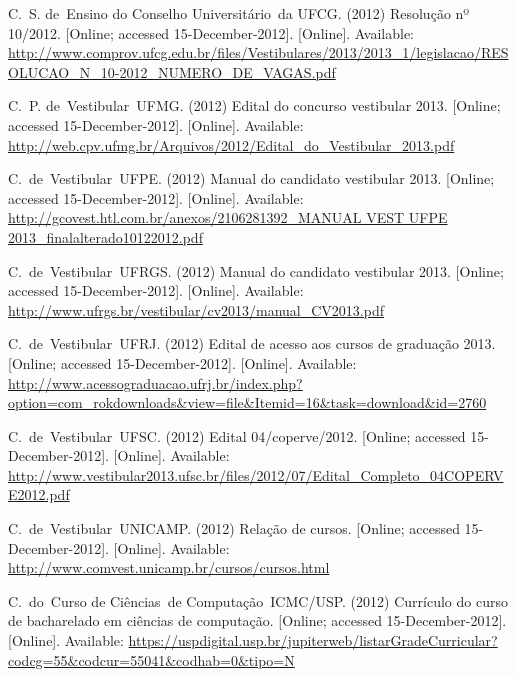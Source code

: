 \documentclass[conference]{IEEEtran}
\begin{document}
\begin{thebibliography}{10}
\BIBentryALTinterwordspacing
C.~S. de~Ensino do Conselho Universit\'ario~da UFCG. (2012) Resolu{\c c}{\~a}o
  nº 10/2012. [Online; accessed 15-December-2012]. [Online]. Available:
  \url{http://www.comprov.ufcg.edu.br/files/Vestibulares/2013/2013_1/legislacao/RESOLUCAO_N_10-2012_NUMERO_DE_VAGAS.pdf}
\BIBentrySTDinterwordspacing

\BIBentryALTinterwordspacing
C.~P. de~Vestibular~UFMG. (2012) Edital do concurso vestibular 2013. [Online;
  accessed 15-December-2012]. [Online]. Available:
  \url{http://web.cpv.ufmg.br/Arquivos/2012/Edital_do_Vestibular_2013.pdf}
\BIBentrySTDinterwordspacing

\BIBentryALTinterwordspacing
C.~de~Vestibular~UFPE. (2012) Manual do candidato vestibular 2013. [Online;
  accessed 15-December-2012]. [Online]. Available:
  \url{http://gcovest.htl.com.br/anexos/2106281392_MANUAL VEST UFPE
  2013_finalalterado10122012.pdf}
\BIBentrySTDinterwordspacing

\BIBentryALTinterwordspacing
C.~de~Vestibular~UFRGS. (2012) Manual do candidato vestibular 2013. [Online;
  accessed 15-December-2012]. [Online]. Available:
  \url{http://www.ufrgs.br/vestibular/cv2013/manual_CV2013.pdf}
\BIBentrySTDinterwordspacing

\BIBentryALTinterwordspacing
C.~de~Vestibular~UFRJ. (2012) Edital de acesso aos cursos de gradua{\c c}{\~a}o
  2013. [Online; accessed 15-December-2012]. [Online]. Available:
  \url{http://www.acessograduacao.ufrj.br/index.php?option=com_rokdownloads&view=file&Itemid=16&task=download&id=2760}
\BIBentrySTDinterwordspacing

\BIBentryALTinterwordspacing
C.~de~Vestibular~UFSC. (2012) Edital 04/coperve/2012. [Online; accessed
  15-December-2012]. [Online]. Available:
  \url{http://www.vestibular2013.ufsc.br/files/2012/07/Edital_Completo_04COPERVE2012.pdf}
\BIBentrySTDinterwordspacing

\BIBentryALTinterwordspacing
C.~de~Vestibular~UNICAMP. (2012) Rela{\c c}{\~a}o de cursos. [Online; accessed
  15-December-2012]. [Online]. Available:
  \url{http://www.comvest.unicamp.br/cursos/cursos.html}
\BIBentrySTDinterwordspacing

\BIBentryALTinterwordspacing
C.~do~Curso de Ci\^encias~de Computa{\c c}{\~a}o~ICMC/USP. (2012) Curr\'iculo
  do curso de bacharelado em ci\^encias de computa{\c c}{\~a}o. [Online;
  accessed 15-December-2012]. [Online]. Available:
  \url{https://uspdigital.usp.br/jupiterweb/listarGradeCurricular?codcg=55&codcur=55041&codhab=0&tipo=N}
\BIBentrySTDinterwordspacing


\end{thebibliography}
\end{document}
